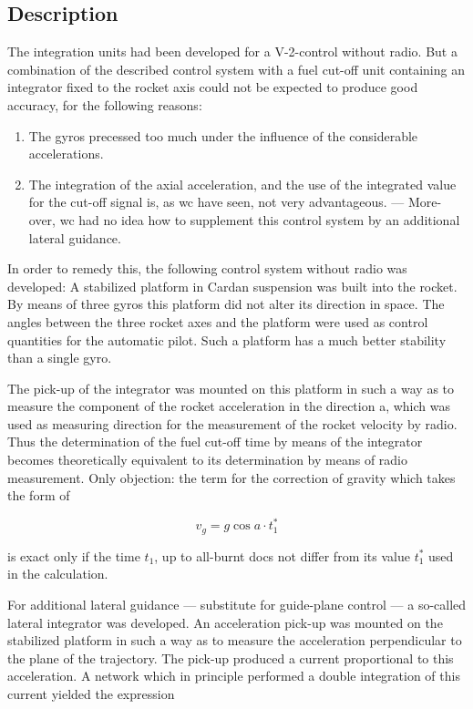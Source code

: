 \documentclass[12pt, a4paper]{article}
\begin{document}
\subsection{Description}

The integration units had been developed for a V-2-control without radio. But a combination of the described control system with a fuel cut-off unit containing an integrator fixed to the rocket axis could not be expected to produce good accuracy, for the following reasons:

\begin{enumerate}
  \item The gyros precessed too much under the influence of the considerable accelerations.

  \item The integration of the axial acceleration, and the use of the integrated value for the cut-off signal is, as wc have seen, not very advantageous. — More- over, wc had no idea how to supplement this control system by an additional lateral guidance.
\end{enumerate}

In order to remedy this, the following control system without radio was developed: A stabilized platform in Cardan suspension was built into the rocket. By means of three gyros this platform did not alter its direction in space. The angles between the three rocket axes and the platform were used as control quantities for the automatic pilot. Such a platform has a much better stability than a single gyro.

The pick-up of the integrator was mounted on this platform in such a way as to measure the component of the rocket acceleration in the direction a, which was used as measuring direction for the measurement of the rocket velocity by radio. Thus the determination of the fuel cut-off time by means of the integrator becomes theoretically equivalent to its determination by means of radio measurement. Only objection: the term for the correction of gravity which takes the form of

\begin{equation}
  v_{g}=g\cos{a}\cdot{t_{1}^{*}}
\end{equation}

is exact only if the time $t_{1}$, up to all-burnt docs not differ from its value $t_{1}^{*}$ used
in the calculation.

For additional lateral guidance — substitute for guide-plane control — a so-called lateral integrator was developed. An acceleration pick-up was mounted on the stabilized platform in such a way as to measure the acceleration perpendicular to the plane of the trajectory. The pick-up produced a current proportional to this acceleration. A network which in principle performed a double integration of this current yielded the expression
\end{document}
